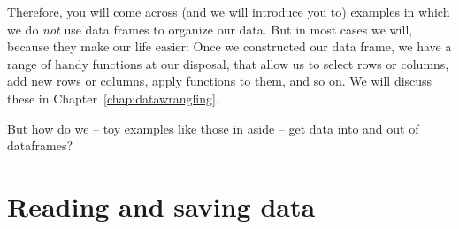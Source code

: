

Therefore, you will come across (and we will introduce you to) examples in which we do \emph{not} use data frames to organize our data.
But in most cases we will, because they make our life easier:
Once we constructed our data frame, we have a range of handy functions at our disposal, that allow us to select rows or columns, add new rows or columns, apply functions to them, and so on.
We will discuss these in Chapter~\ref{chap:datawrangling}.

But how do we -- toy examples like those in  aside -- get data into and out of dataframes? 










\section{Reading and saving data}
\label{sec:reading}

